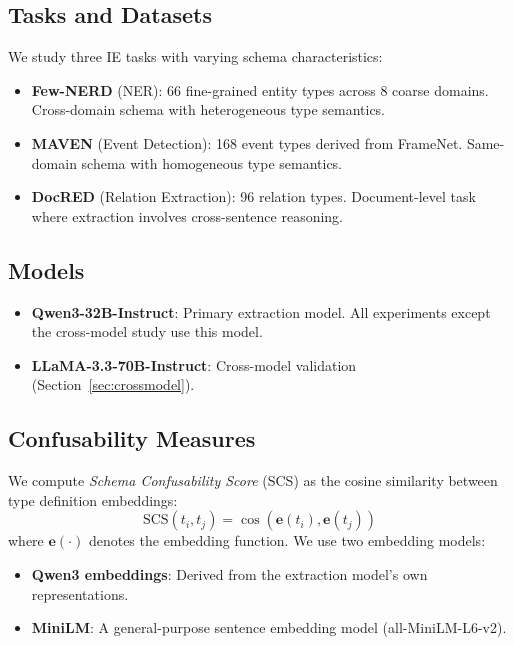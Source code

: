 \documentclass[11pt,a4paper]{article}
\begin{document}
\subsection{Tasks and Datasets}

We study three IE tasks with varying schema characteristics:

\begin{itemize}[leftmargin=1.5em,itemsep=2pt]
\item \textbf{Few-NERD} (NER): 66 fine-grained entity types across 8 coarse domains. Cross-domain schema with heterogeneous type semantics.
\item \textbf{MAVEN} (Event Detection): 168 event types derived from FrameNet. Same-domain schema with homogeneous type semantics.
\item \textbf{DocRED} (Relation Extraction): 96 relation types. Document-level task where extraction involves cross-sentence reasoning.
\end{itemize}

\subsection{Models}

\begin{itemize}[leftmargin=1.5em,itemsep=2pt]
\item \textbf{Qwen3-32B-Instruct}: Primary extraction model. All experiments except the cross-model study use this model.
\item \textbf{LLaMA-3.3-70B-Instruct}: Cross-model validation (Section~\ref{sec:crossmodel}).
\end{itemize}

\subsection{Confusability Measures}

We compute \emph{Schema Confusability Score} (SCS) as the cosine similarity between type definition embeddings:
\begin{equation}
\text{SCS}(t_i, t_j) = \cos(\mathbf{e}(t_i), \mathbf{e}(t_j))
\end{equation}
where $\mathbf{e}(\cdot)$ denotes the embedding function. We use two embedding models:
\begin{itemize}[leftmargin=1.5em,itemsep=2pt]
\item \textbf{Qwen3 embeddings}: Derived from the extraction model's own representations.
\item \textbf{MiniLM}: A general-purpose sentence embedding model (all-MiniLM-L6-v2).
\end{itemize}
\end{document}
